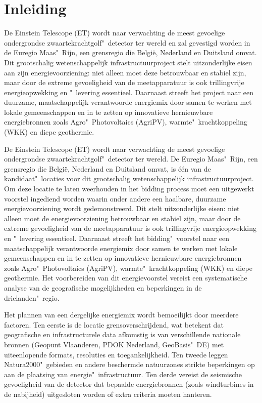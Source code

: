 \section{Inleiding}%
\label{sec:inleiding}

De Einstein Telescope (ET) wordt naar verwachting de meest gevoelige ondergrondse zwaartekrachtgolf"~detector ter wereld en zal gevestigd worden in de Euregio Maas"~Rijn, een grensregio die België, Nederland en Duitsland omvat. Dit grootschalig wetenschappelijk infrastructuurproject stelt uitzonderlijke eisen aan zijn energievoorziening: niet alleen moet deze betrouwbaar en stabiel zijn, maar door de extreme gevoeligheid van de meetapparatuur is ook trillingvrije energieopwekking en "~levering essentieel. Daarnaast streeft het project naar een duurzame, maatschappelijk verantwoorde energiemix door samen te werken met lokale gemeenschappen en in te zetten op innovatieve hernieuwbare energiebronnen zoals Agro"~Photovoltaics (AgriPV), warmte"~krachtkoppeling (WKK) en diepe geothermie.

De Einstein Telescope (ET) wordt naar verwachting de meest gevoelige ondergrondse zwaartekrachtgolf"~detector ter wereld. De Euregio Maas"~Rijn, een grensregio die België, Nederland en Duitsland omvat, is één van de kandidaat"~locaties voor dit grootschalig wetenschappelijk infrastructuurproject. Om deze locatie te laten weerhouden in het bidding process moet een uitgewerkt voorstel ingediend worden waarin onder andere een haalbare, duurzame energievoorziening wordt gedemonstreerd. Dit stelt uitzonderlijke eisen: niet alleen moet de energievoorziening betrouwbaar en stabiel zijn, maar door de extreme gevoeligheid van de meetapparatuur is ook trillingvrije energieopwekking en "~levering essentieel. Daarnaast streeft het bidding"~voorstel naar een maatschappelijk verantwoorde energiemix door samen te werken met lokale gemeenschappen en in te zetten op innovatieve hernieuwbare energiebronnen zoals Agro"~Photovoltaics (AgriPV), warmte"~krachtkoppeling (WKK) en diepe geothermie. Het voorbereiden van dit energievoorstel vereist een systematische analyse van de geografische mogelijkheden en beperkingen in de drielanden"~regio.

Het plannen van een dergelijke energiemix wordt bemoeilijkt door meerdere factoren. Ten eerste is de locatie grensoverschrijdend, wat betekent dat geografische en infrastructurele data afkomstig is van verschillende nationale bronnen (Geopunt Vlaanderen, PDOK Nederland, GeoBasis"~DE) met uiteenlopende formats, resoluties en toegankelijkheid. Ten tweede leggen Natura2000"~gebieden en andere beschermde natuurzones strikte beperkingen op aan de plaatsing van energie"~infrastructuur. Ten derde vereist de seismische gevoeligheid van de detector dat bepaalde energiebronnen (zoals windturbines in de nabijheid) uitgesloten worden of extra criteria moeten hanteren.

